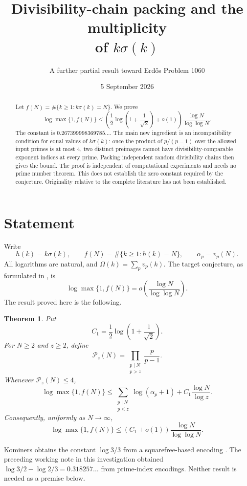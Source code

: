 \documentclass[11pt,a4paper]{article}
\title{Divisibility-chain packing and the multiplicity\\of $k\sigma(k)$}
\author{A further partial result toward Erd\H{o}s Problem 1060}
\date{5 September 2026}
\newtheorem{theorem}{Theorem}
\theoremstyle{remark}\newtheorem*{remark}{Remark}
\begin{document}
\maketitle\thispagestyle{fancy}
\begin{abstract}
Let $f(N)=\#\{k\ge1:k\sigma(k)=N\}$. We prove
\[
\log\max\{1,f(N)\}\le
\left(\frac12\log\left(1+\frac1{\sqrt2}\right)+o(1)\right)
\frac{\log N}{\log\log N}.
\]
The constant is $0.267399998369785\ldots$. The main new ingredient is an incompatibility condition for equal values of $k\sigma(k)$: once the product of $p/(p-1)$ over the allowed input primes is at most $4$, two distinct preimages cannot have divisibility-comparable exponent indices at every prime. Packing independent random divisibility chains then gives the bound. The proof is independent of computational experiments and needs no prime number theorem. This does not establish the zero constant required by the conjecture. Originality relative to the complete literature has not been established.
\end{abstract}

\section{Statement}
Write
\[
h(k)=k\sigma(k),\qquad f(N)=\#\{k\ge1:h(k)=N\},\qquad \alpha_p=v_p(N).
\]
All logarithms are natural, and $\Omega(k)=\sum_p v_p(k)$. The target conjecture, as formulated in \cite{Kominers}, is
\[
\log\max\{1,f(N)\}=o\!\left(\frac{\log N}{\log\log N}\right).
\]
The result proved here is the following.

\begin{theorem}\label{thm:main}
Put
\[
C_1=\frac12\log\left(1+\frac1{\sqrt2}\right).
\]
For $N\ge2$ and $z\ge2$, define
\[
\mathcal P_z(N)=\prod_{\substack{p\mid N\\p>z}}\frac{p}{p-1}.
\]
Whenever $\mathcal P_z(N)\le4$,
\begin{equation}\label{eq:finite}
\boxed{\log\max\{1,f(N)\}\le
\sum_{\substack{p\mid N\\p\le z}}\log(\alpha_p+1)
+C_1\frac{\log N}{\log z}.}
\end{equation}
Consequently, uniformly as $N\to\infty$,
\begin{equation}\label{eq:asymptotic}
\boxed{\log\max\{1,f(N)\}\le
(C_1+o(1))\frac{\log N}{\log\log N}.}
\end{equation}
\end{theorem}
Kominers obtains the constant $\log3/3$ from a squarefree-based encoding \cite{Kominers}. The preceding working note in this investigation obtained $\log3/2-\log2/3=0.318257\ldots$ from prime-index encodings. Neither result is needed as a premise below.
\end{document}
